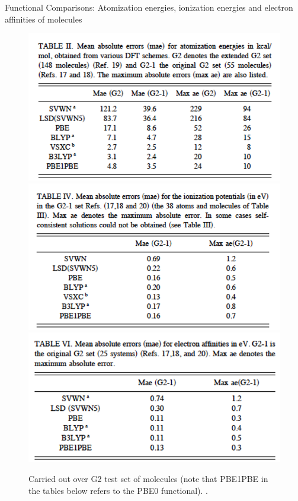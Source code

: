 \documentclass[aspectratio=169]{beamer}
\begin{document}
\begin{frame}{Functional Comparisons: Atomization energies, ionization energies and electron affinities of molecules}
\begin{figure}
    \centering
    \includegraphics[width=0.3\linewidth]{lectures/figures/6_atomization_energies.png}
    \includegraphics[width=0.3\linewidth]{lectures/figures/6_IEs.png}
    \includegraphics[width=0.3\linewidth]{lectures/figures/6_EAs.png}
    \caption{Carried out over G2 test set of molecules (note that PBE1PBE in the tables below refers to the PBE0 functional). \cite{ernzerhofAssessmentPerdewBurkeErnzerhofExchangecorrelation1999}.}
\end{figure}

\end{frame} 
\end{document}
